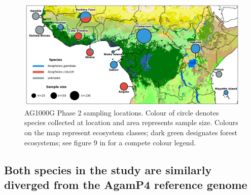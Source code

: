 \documentclass[a4paper,11pt,abstracton,hidelinks]{scrartcl}
\begin{document}
\begin{figure}[h]
	\begin{center}
		\includegraphics*[width=5.8in]{artwork/collection_site_map.jpg}
	\end{center}
	\caption{AG1000G Phase 2 sampling locations. Colour of circle denotes species collected at location and area represents sample size. Colours on the map represent ecosystem classes; dark green designates forest ecosystems; see figure 9 in \cite{sayre2013} for a compete colour legend.}
	\label{sample_map}
\end{figure}


%


\subsection*{Both species in the study are similarly diverged from the AgamP4 reference genome}
\end{document}
